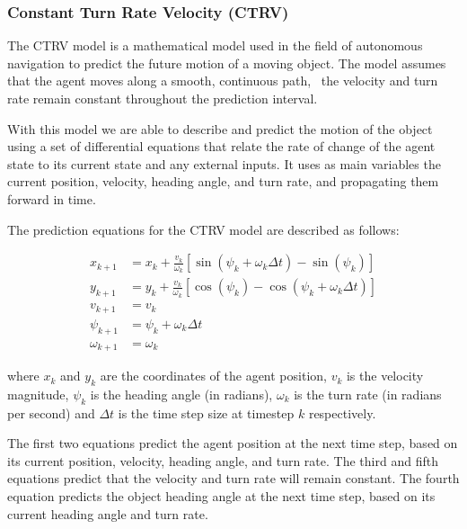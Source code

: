 \subsubsection{Constant Turn Rate Velocity (CTRV)}
\label{subsubsec:3_CTRV}

The \acf{CTRV} model is a mathematical model used in the field of autonomous navigation to predict the future motion of a moving object. The model assumes that the agent moves along a smooth, continuous path, \ie \ the velocity and turn rate remain constant throughout the prediction interval.

With this model we are able to describe and predict the motion of the object using a set of differential equations that relate the rate of change of the agent state to its current state and any external inputs. It uses as main variables the current position, velocity, heading angle, and turn rate, and propagating them forward in time. %

The prediction equations for the CTRV model are described as follows:

\begin{equation}
\begin{split}
	x_{k+1} &= x_k + \frac{v_k}{\omega_k}\left[\sin(\psi_k+\omega_k\Delta t)-\sin(\psi_k)\right] \\
	y_{k+1} &= y_k + \frac{v_k}{\omega_k}\left[\cos(\psi_k)-\cos(\psi_k+\omega_k\Delta t)\right] \\
	v_{k+1} &= v_k \\
	\psi_{k+1} &= \psi_k + \omega_k\Delta t \\
	\omega_{k+1} &= \omega_k
\end{split}
\end{equation}
	
where $x_k$ and $y_k$ are the coordinates of the agent position, $v_k$ is the velocity magnitude, $\psi_k$ is the heading angle (in radians), $\omega_k$ is the turn rate (in radians per second) and $\Delta t$ is the time step size at timestep $k$ respectively.

The first two equations predict the agent position at the next time step, based on its current position, velocity, heading angle, and turn rate. The third and fifth equations predict that the velocity and turn rate will remain constant. The fourth equation predicts the object heading angle at the next time step, based on its current heading angle and turn rate.

